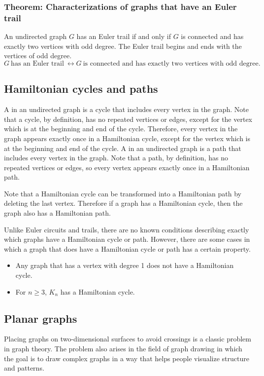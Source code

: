 \subsubsection*{Theorem: Characterizations of graphs that have an Euler trail}
An undirected graph $G$ has an Euler trail if and only if $G$ is connected and has exactly two vertices with odd degree. The Euler trail begins and ends with the vertices of odd degree.
\[
  G~\text{has an Euler trail}~\leftrightarrow G~\text{is connected and has exactly two vertices with odd degree}.
\]

\subsection{Hamiltonian cycles and paths}
A  in an undirected graph is a cycle that includes every vertex in the graph. Note that a cycle, by definition, has no repeated vertices or edges, except for the vertex which is at the beginning and end of the cycle. Therefore, every vertex in the graph appears exactly once in a Hamiltonian cycle, except for the vertex which is at the beginning and end of the cycle. A  in an undirected graph is a path that includes every vertex in the graph. Note that a path, by definition, has no repeated vertices or edges, so every vertex appears exactly once in a Hamiltonian path.

Note that a Hamiltonian cycle can be transformed into a Hamiltonian path by deleting the last vertex. Therefore if a graph has a Hamiltonian cycle, then the graph also has a Hamiltonian path.

Unlike Euler circuits and trails, there are no known conditions describing exactly which graphs have a Hamiltonian cycle or path. However, there are some cases in which a graph that does have a Hamiltonian cycle or path has a certain property.
\begin{itemize}
  \item Any graph that has a vertex with degree 1 does not have a Hamiltonian cycle.
  \item For $n \geq 3$, $K_n$ has a Hamiltonian cycle.
\end{itemize}

\subsection{Planar graphs}
Placing graphs on two-dimensional surfaces to avoid crossings is a classic problem in graph theory. The problem also arises in the field of graph drawing in which the goal is to draw complex graphs in a way that helps people visualize structure and patterns.


